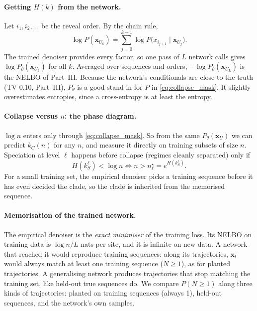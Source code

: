 \paragraph{Getting $H(k)$ from the network.} Let $i_1,i_2,\dots$ be the reveal order. By the chain rule,
\[
\log P(\bm x_{U_k})=\sum_{j=0}^{k-1}\log P\big(x_{i_{j+1}}\mid\bm x_{U_j}\big).
\]
The trained denoiser provides every factor,
so one pass of $L$ network calls gives $\log P_\theta(\bm x_{U_k})$ for all $k$. Averaged over sequences and orders,
$-\log P_\theta(\bm x_{U_L})$ is the NELBO of Part~III. Because the network's conditionals are close to the truth
(TV 0.10, Part~III), $P_\theta$ is a good stand-in for $P$ in \eqref{eq:collapse_mask}. It slightly overestimates
entropies, since a cross-entropy is at least the entropy.

\paragraph{Collapse versus $n$: the phase diagram.} $\log n$ enters only through \eqref{eq:collapse_mask}. So from
the same $P_\theta(\bm x_U)$ we can predict $k_C(n)$ for any $n$, and measure it directly on training subsets of size
$n$. Speciation at level $\ell$ happens before collapse (regimes cleanly separated) only if
\[
H(k_S^\ell)<\log n\iff n>n^\star_\ell=e^{H(k_S^\ell)}.
\]
For a small training set, the empirical denoiser picks a training sequence before it has even decided the clade, so
the clade is inherited from the memorised sequence.

\paragraph{Memorisation of the trained network.} The empirical denoiser is the \emph{exact minimiser} of the training
loss. Its NELBO on training data is $\log n/L$ nats per site, and it is infinite on new data. A network that reached it
would reproduce training sequences: along its trajectories, $\bm x_t$ would always match at least one training
sequence ($N\ge1$), as for planted trajectories. A generalising network produces trajectories that stop matching
the training set, like held-out true sequences do. We compare $P(N\ge1)$ along three kinds of trajectories:
planted on training sequences (always 1), held-out sequences, and the network's own samples.

